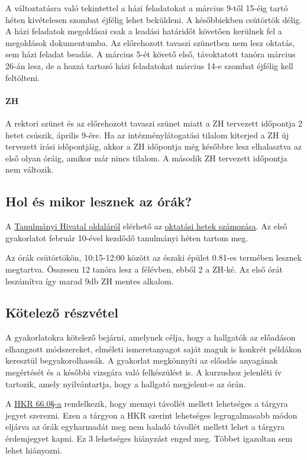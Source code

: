 \documentclass[12pt,a4paper]{scrartcl}
\begin{document}
A változtatásra való tekintettel a házi feladatokat a március 9-től 15-éig tartó héten kivételesen szombat éjfélig lehet beküldeni. A későbbiekben csütörtök délig. A házi feladatok megoldásai csak a leadási határidőt követően kerülnek fel a megoldások dokumentumba. Az előrehozott tavaszi szünetben nem lesz oktatás, sem házi feladat beadás. A március 5-ét követő első, távoktatott tanóra március 26-án lesz, de a hozzá tartozó házi feladatokat március 14-e szombat éjfélig kell feltölteni.

\paragraph{ZH}
A rektori szünet és az előrehozott tavaszi szünet miatt a ZH tervezett időpontja 2 hetet csúszik, április 9-ére. Ha az intézménylátogatási tilalom kiterjed a ZH új tervezett írási időpontjáig, akkor a ZH időpontja még későbbre lesz elhalasztva az első olyan óráig, amikor már nincs tilalom. A második ZH tervezett időpontja nem változik.

\subsection{Hol és mikor lesznek az órák?}
A \href{http://to.ttk.elte.hu}{Tanulmányi Hivatal oldaláról} elérhető az \href{http://to.ttk.elte.hu/sites/default/files/201920_1_2fev_oktatasihetek_22.xls}{oktatási hetek számozása}. Az első gyakorlatot február 10-ével kezdődő tanulmányi héten tartom meg.

Az órák csütörtökön, 10:15-12:00 között az északi épület 0.81-es termében lesznek megtartva. Összesen 12 tanóra lesz a félévben, ebből 2 a ZH-ké. Az első órát leszámítva így marad 9db ZH mentes alkalom.

\subsection{Kötelező részvétel}
A gyakorlatokra kötelező bejárni, amelynek célja, hogy a hallgatók az előadáson elhangzott módszereket, elméleti ismeretanyagot saját maguk is konkrét példákon keresztül begyakorolhassák. A gyakorlat megkönnyíti az előadás anyagának megértését és a későbbi vizsgára való felkészülést is. A kurzushoz jelenléti ív tartozik, amely nyilvántartja, hogy a hallgató megjelent-e az órán.

A \href{https://www.elte.hu/file/ELTE_SZMSZ_II.pdf#page=59}{HKR 66.0§-a} rendelkezik, hogy mennyi távollét mellett lehetséges a tárgyra jegyet szerezni. Ezen a tárgyon a HKR szerint lehetséges legrugalmasabb módon eljárva az órák egyharmadát meg nem haladó távollét mellett lehet a tárgyra érdemjegyet kapni. Ez 3 lehetséges hiányzást enged meg. Többet igazoltan sem lehet hiányozni.
\end{document}
